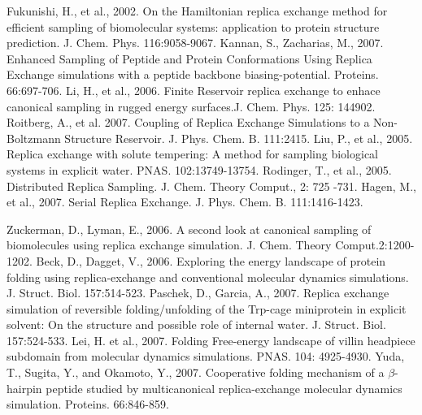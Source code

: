 \documentclass[12pt]{article}
\numberwithin{equation}{subsection}
\begin{document}
\begin{thebibliography}{1}
 Fukunishi, H., et al., 2002. On the Hamiltonian replica exchange method for efficient sampling of biomolecular systems: application to protein structure prediction. J. Chem. Phys. 116:9058-9067.
 Kannan, S., Zacharias, M., 2007. Enhanced Sampling of Peptide and Protein Conformations Using Replica Exchange simulations with a peptide backbone biasing-potential. Proteins. 66:697-706.
  Li, H., et al., 2006. Finite Reservoir replica exchange to enhace canonical sampling in rugged energy surfaces.J. Chem. Phys. 125: 144902.
 Roitberg, A., et al. 2007. Coupling of Replica Exchange Simulations to a Non-Boltzmann Structure Reservoir. J. Phys. Chem. B. 111:2415.
 Liu, P., et al., 2005.  Replica exchange with solute tempering: A method for sampling biological systems in explicit water. PNAS. 102:13749-13754.
 Rodinger, T., et al., 2005. Distributed Replica Sampling. J. Chem. Theory Comput., 2: 725 -731.
 Hagen, M., et al., 2007. Serial Replica Exchange. J. Phys. Chem. B. 111:1416-1423.

  Zuckerman, D., Lyman, E., 2006.  A second look at canonical sampling of biomolecules using replica exchange simulation. J. Chem. Theory Comput.2:1200-1202.
 Beck, D., Dagget, V., 2006. Exploring the energy landscape of protein folding using replica-exchange and conventional molecular dynamics simulations. J. Struct. Biol. 157:514-523.
 Paschek, D., Garcia, A., 2007. Replica exchange simulation of reversible folding/unfolding of the Trp-cage miniprotein in explicit solvent: On the structure and possible role of internal water. J. Struct. Biol. 157:524-533.
 Lei, H. et al., 2007. Folding Free-energy landscape of villin headpiece subdomain from molecular dynamics simulations. PNAS. 104: 4925-4930.
 Yuda, T., Sugita, Y., and Okamoto, Y., 2007. Cooperative folding mechanism of a $\beta$-hairpin peptide studied by multicanonical replica-exchange molecular dynamics simulation. Proteins. 66:846-859.


\end{thebibliography}
\end{document}
